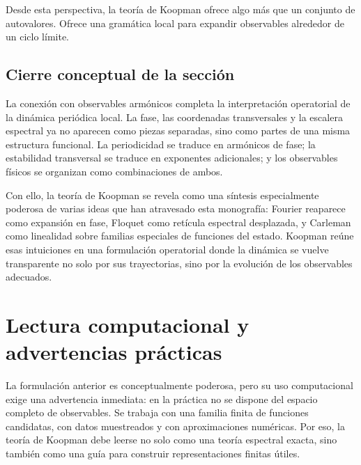 Desde esta perspectiva, la teoría de Koopman ofrece algo más que un conjunto de autovalores. Ofrece una gramática local para expandir observables alrededor de un ciclo límite.


\subsection{Cierre conceptual de la sección}

La conexión con observables armónicos completa la interpretación operatorial de la dinámica periódica local. La fase, las coordenadas transversales y la escalera espectral ya no aparecen como piezas separadas, sino como partes de una misma estructura funcional. La periodicidad se traduce en armónicos de fase; la estabilidad transversal se traduce en exponentes adicionales; y los observables físicos se organizan como combinaciones de ambos.

Con ello, la teoría de Koopman se revela como una síntesis especialmente poderosa de varias ideas que han atravesado esta monografía: Fourier reaparece como expansión en fase, Floquet como retícula espectral desplazada, y Carleman como linealidad sobre familias especiales de funciones del estado. Koopman reúne esas intuiciones en una formulación operatorial donde la dinámica se vuelve transparente no solo por sus trayectorias, sino por la evolución de los observables adecuados.

\section{Lectura computacional y advertencias prácticas}

La formulación anterior es conceptualmente poderosa, pero su uso computacional exige una advertencia inmediata: en la práctica no se dispone del espacio completo de observables. Se trabaja con una familia finita de funciones candidatas, con datos muestreados y con aproximaciones numéricas. Por eso, la teoría de Koopman debe leerse no solo como una teoría espectral exacta, sino también como una guía para construir representaciones finitas útiles.

